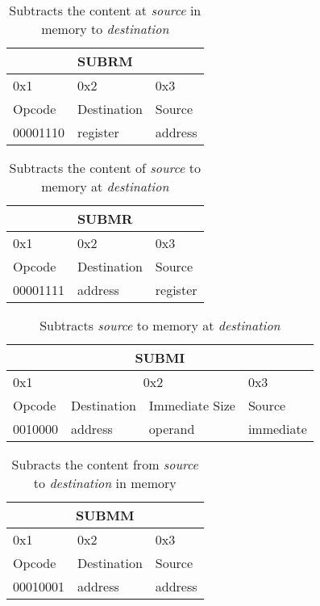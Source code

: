 \documentclass{article}
\begin{document}
\begin{table}[H]
  \centering
  \begin{tabular} { | p{2cm} | | p{2cm} | p{2cm} |}
    \hline
    \multicolumn{3}{|c|}{SUBRM}\\
    \hline
    0x1 & 0x2 & 0x3\\
    \hline
    Opcode & Destination & Source\\
    00001110 & register & address\\
    \hline
  \end{tabular}
  \caption{Subtracts the content at \textit{source} in memory to \textit{destination}}
\end{table}

\begin{table}[H]
  \centering
  \begin{tabular} { | p{2cm} | | p{2cm} | p{2cm} |}
    \hline
    \multicolumn{3}{|c|}{SUBMR}\\
    \hline
    0x1 & 0x2 & 0x3\\
    \hline
    Opcode & Destination & Source\\
    00001111 & address & register\\
    \hline
  \end{tabular}
  \caption{Subtracts the content of \textit{source} to memory at \textit{destination}}
\end{table}

\begin{table}[H]
  \centering
  \begin{tabular} { | p{2cm} | | p{2cm} | p{} | | p{2cm} |}
    \hline
    \multicolumn{4}{|c|}{SUBMI}\\
    \hline
    0x1 & \multicolumn{2}{|c|}{0x2} & 0x3\\
    \hline
    Opcode & Destination & Immediate Size & Source\\
    0010000 & address & operand & immediate\\
    \hline
  \end{tabular}
  \caption{Subtracts \textit{source} to memory at \textit{destination}}
\end{table}

\begin{table}[H]
  \centering
  \begin{tabular} { | p{2cm} | | p{2cm} | p{2cm} |}
    \hline
    \multicolumn{3}{|c|}{SUBMM}\\
    \hline
    0x1 & 0x2 & 0x3\\
    \hline
    Opcode & Destination & Source\\
    00010001 & address & address\\
    \hline
  \end{tabular}
  \caption{Subracts the content from \textit{source} to \textit{destination} in memory}
\end{table}
\end{document}

